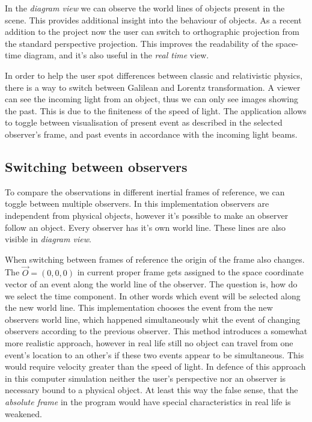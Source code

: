 \documentclass{egpubl}
\begin{document}
In the \emph{diagram view} we can observe the world lines of objects present in the scene. This provides additional insight into the behaviour of objects. As a recent addition to the project now the user can switch to orthographic projection from the standard perspective projection. This improves the readability of the space-time diagram, and it's also useful in the \emph{real time} view.

In order to help the user spot differences between classic and relativistic physics, there is a way to switch between Galilean \cite{KHGalilei} and Lorentz transformation. A viewer can see the incoming light from an object, thus we can only see images showing the past. This is due to the finiteness of the speed of light. The application allows to toggle between visualisation of present event as described in the selected observer's frame, and past events in accordance with the incoming light beams.

\subsection{Switching between observers}
To compare the observations in different inertial frames of reference, we can toggle between multiple observers. In this implementation observers are independent from physical objects, however it's possible to make an observer follow an object. Every observer has it's own world line. These lines are also visible in \emph{diagram view}.

When switching between frames of reference the origin of the frame also changes. The $\vec{O} =(0,0,0)$ in current proper frame gets assigned to the space coordinate vector of an event along the world line of the observer. The question is, how do we select the time component. In other words which event will be selected along the new world line. This implementation chooses the event from the new observers world line, which happened simultaneously whit the event of changing observers according to the previous observer. This method introduces a somewhat more realistic approach, however in real life still no object can travel from one event's location to an other's if these two events appear to be simultaneous. This would require velocity greater than the speed of light. In defence of this approach in this computer simulation neither the user's perspective nor an observer is necessary bound to a physical object. At least this way the false sense, that the \emph{absolute frame} in the program would have special characteristics in real life is weakened.
\end{document}
